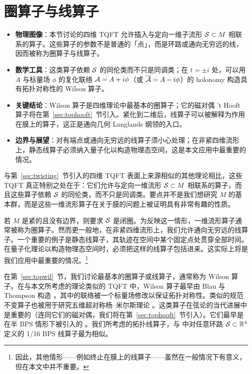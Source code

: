 \section{圈算子与线算子}

\label{sec:loopop} 

\begin{keytakeaways}
\begin{itemize}[leftmargin=1.4em,itemsep=2pt,topsep=2pt]
\item \textbf{物理图像}：本节讨论的四维 TQFT 允许插入与定向一维子流形 ${\cal S}\subset M$ 相联系的算子。这些算子的参数不是普通的「点」，而是环路或通向无穷远的线，因而被称为圈算子与线算子。
\item \textbf{数学工具}：这类算子依赖 ${\cal S}$ 的同伦类而不只是同调类；在 $t=\pm i$ 处，可以用 $A$ 与标量场 $\phi$ 的复化联络 $\CA=A+i\phi$（或 $\overline\CA=A-i\phi$）的 holonomy 构造具有拓扑对称性的 Wilson 算子。
\item \textbf{关键结论}：Wilson 算子是四维理论中最基本的圈算子；它的磁对偶 't Hooft 算子将在第~\ref{sec:tophooft}~节引入。紧化到二维后，线算子可以被解释为作用在膜上的算子，这正是通向几何 Langlands 纲领的入口。
\item \textbf{边界与展望}：对有端点或通向无穷远的线算子须小心处理；在非紧四维流形上，静态线算子必须纳入量子化以构造物理态空间，这是本文应用中最重要的情况。
\end{itemize}
\end{keytakeaways}

与第~\ref{sec:twisting}~节引入的四维 TQFT 表面上来源相似的其他理论相比，这些 TQFT 真正特别之处在于：它们允许与定向一维流形 ${\cal S}\subset M$ 相联系的算子，而且这些算子依赖 ${\cal S}$ 的同伦类，而不只是同调类。要点并不是我们想研究 $M$ 的基本群，而是这些一维流形算子在关于膜的问题上被证明具有非常有趣的性质。

若 $M$ 是紧的且没有边界，则要求 ${\cal S}$ 是闭圈。为反映这一情形，一维流形算子通常被称为圈算子。然而更一般地，在非紧四维流形上，我们允许通向无穷远的线算子。一个重要的例子是静态线算子，其轨迹在空间中某个固定点处贯穿全部时间。在量子化理论以构造物理态空间时，必须把这样的线算子包括进来。这实际上将是我们应用中最重要的情况。\footnote{因此，其他情形——例如终止在膜上的线算子——虽然在一般情况下有意义，但在本文中并不重要。}

% 
% 

在第~\ref{sec:topwil}~节，我们讨论最基本的圈算子或线算子，通常称为 Wilson 算子。在与本文所考虑的理论类似的 TQFT 中，Wilson 算子最早由 Blau 与 Thompson 构造 ，其中的联络被一个标量场修改以保证拓扑对称性。类似的规范不变算子也被用于研究五维超对称杨--米尔斯理论 。这类算子在弦论的当代进展中是重要的（连同它们的磁对偶，我们将在第~\ref{sec:tophooft}~节引入）。它们最早是在半 BPS 情形下被引入的 \cite{ref86,ref87}。我们所考虑的拓扑线算子，与 \cite{ref88} 中对任意环路 ${\cal S}\subset \Bbb{R}^4$ 定义的 1/16 BPS 线算子最为相似。

